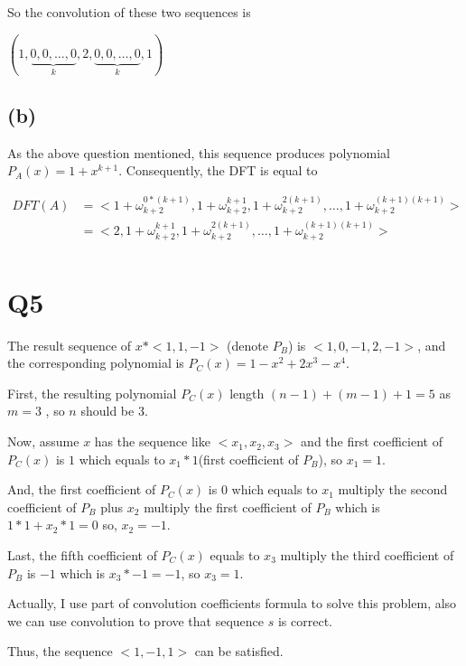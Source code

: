\documentclass[a4paper]{article}
\begin{document}
	So the convolution of these two sequences is 
	
	$(1,\underbrace{0,0,\dots,0}_{k},2,\underbrace{0,0,\dots,0}_{k},1)$
	\subsection*{(b)}
	As the above question mentioned, this sequence produces polynomial $P_A(x) = 1 + x^{k+1}$.
	Consequently, the DFT is equal to
	
	\begin{equation*}
		\begin{aligned}
		DFT(A) &= 
			<1+\omega_{k+2}^{0*(k+1)},1+\omega_{k+2}^{k+1},1+\omega_{k+2}^{2(k+1)},\dots,1+\omega_{k+2}^{(k+1)(k+1)}>\\ 
			&= <2,1+\omega_{k+2}^{k+1},1+\omega_{k+2}^{2(k+1)},\dots,1+\omega_{k+2}^{(k+1)(k+1)}>\\
		\end{aligned}
	\end{equation*}

	\section*{Q5}
	The result sequence of $x*<1,1,-1>$ (denote $P_B$) is $<1,0,-1,2,-1>$, and the corresponding polynomial is $P_C(x)=1-x^2+2x^3-x^4$.
	
	First, the resulting polynomial $P_C(x)$ length $(n-1)+(m-1)+1 = 5$ as $m=3$ , so $n$ should be $3$.
	
	Now, assume $x$ has the sequence like $<x_1, x_2, x_3>$ and the first coefficient of $P_C(x)$ is $1$ which equals to  $x_1 * 1$(first coefficient of $P_B$), so $x_1 = 1$.
	
	And, the first coefficient of $P_C(x)$ is 0 which equals to $x_1$ multiply the second coefficient of $P_B$ plus $x_2$ multiply the first coefficient of $P_B$ which is $1 * 1 + x_2 * 1 = 0$ so, $x_2 = -1$.
	
	Last, the fifth coefficient of $P_C(x)$ equals to $x_3$ multiply the third coefficient of $P_B$ is $-1$ which is $x_3 * -1 = -1$, so $x_3 = 1$.
	
	Actually, I use part of convolution coefficients formula to solve this problem, also we can use convolution to prove that sequence $s$ is correct.
	
	Thus, the sequence $<1, -1, 1>$ can be satisfied.
	
	
	
	
	
	
	
	
	
	
	
	
	
	
	
	
	
	
	
	
	
	
	
	
	
	
\end{document}
